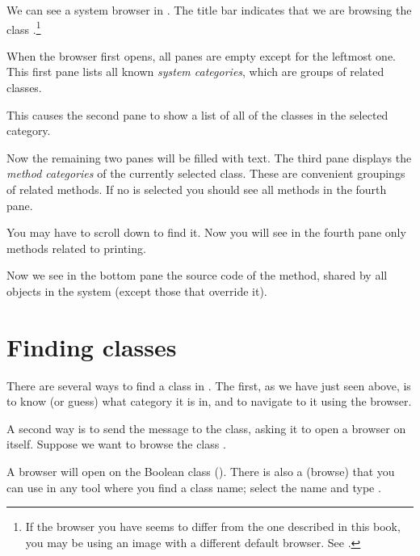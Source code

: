 \documentclass[a4paper,10pt,twoside]{book}
\begin{document}
We can see a system browser in .
The title bar indicates that we are browsing the class .\footnote{If the browser you have seems to differ from the one described in this book, you may be using an image with a different default browser. See .}

When the browser first opens, all panes are empty except for the leftmost one.
This first pane lists all known \emph{system categories}, which are groups of related classes.

This causes the second pane to show a list of all of the classes in the selected category.

Now the remaining two panes will be filled with text.
The third pane displays the \emph{method categories} of the currently selected class.
These are convenient groupings of related methods.
If no  is selected you should see all methods in the fourth pane.

You may have to scroll down to find it.
Now you will see in the fourth pane only methods related to printing.

Now we see in the bottom pane the source code of the  method, shared by all objects in the system (except those that override it).

\section{Finding classes}

There are several ways to find a class in \sq.  The first, as we have just seen above, is to know (or guess) what category it is in, and to navigate to it using the browser.

A second way is to send the  message to the class, asking it to open a browser on itself.  Suppose we want to browse the class .
 
A browser will open on the Boolean class ().
There is also a   (browse) that you can use in any tool where you find a class name;
select the name and type .
\end{document}
